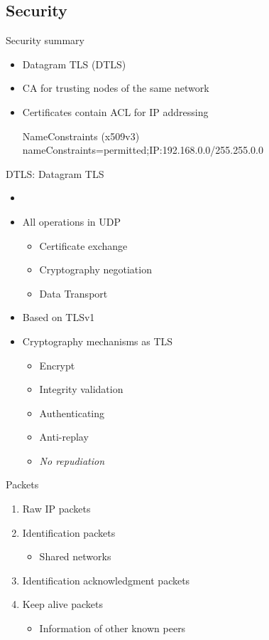 \documentclass{beamer}
\begin{document}
\subsection{Security}
\begin{frame}{Security summary}
	\begin{itemize}
	\item Datagram TLS (DTLS)
	\item CA for trusting nodes of the same network
	\item Certificates contain ACL for IP addressing
	\begin{block}{NameConstraints (x509v3)}
	nameConstraints=permitted;IP:192.168.0.0/255.255.0.0
	\end{block}
	\end{itemize}
\end{frame}
\begin{frame}{DTLS: Datagram TLS}
	\begin{itemize}
	\item\begin{thebibliography}\beamertemplatearticlebibitems
	\item RFC 4347
	\end{thebibliography}
	\item All operations in UDP
		\begin{itemize}
		\item Certificate exchange
		\item Cryptography negotiation
		\item Data Transport
		\end{itemize}
	\item Based on TLSv1
	\item Cryptography mechanisms as TLS 
		\begin{itemize}
		\item Encrypt
		\item Integrity validation
		\item Authenticating
		\item Anti-replay
		\item \emph{No repudiation}
		\end{itemize}
	\end{itemize}
\end{frame}
\begin{frame}{Packets}
	\begin{enumerate}
	\item Raw IP packets
	\vspace{1em}
	\item Identification packets
		\begin{itemize}
		\item Shared networks
		\end{itemize}
	\item Identification acknowledgment packets
	\item Keep alive packets
		\begin{itemize}
		\item Information of other known peers
		\end{itemize}
	\end{enumerate}
\end{frame}
\end{document}

